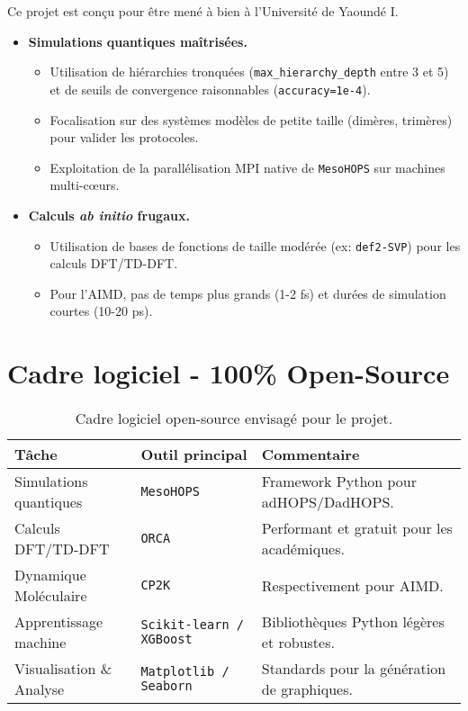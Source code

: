\documentclass[12pt, a4paper]{article}
\begin{document}
Ce projet est conçu pour être mené à bien à l'Université de Yaoundé I.
\begin{itemize}
    \item \textbf{Simulations quantiques maîtrisées.}
        \begin{itemize}
            \item Utilisation de hiérarchies tronquées (\texttt{max\_hierarchy\_depth} entre 3 et 5) et de seuils de convergence raisonnables (\texttt{accuracy=1e-4}).
            \item Focalisation sur des systèmes modèles de petite taille (dimères, trimères) pour valider les protocoles.
            \item Exploitation de la parallélisation MPI native de \texttt{MesoHOPS} sur machines multi-cœurs.
        \end{itemize}

    \item \textbf{Calculs \textit{ab initio} frugaux.}
        \begin{itemize}
            \item Utilisation de bases de fonctions de taille modérée (ex: \texttt{def2-SVP}) pour les calculs DFT/TD-DFT.
            \item Pour l'AIMD, pas de temps plus grands (1-2 fs) et durées de simulation courtes (10-20 ps).
        \end{itemize}
\end{itemize}

\section{Cadre logiciel - 100\% Open-Source}
\begin{table}[htp]
    \centering
    \caption{Cadre logiciel open-source envisagé pour le projet.}
    \label{tab:software}
    \begin{tabular}{@{}lll@{}}
        \toprule
        \textbf{Tâche} & \textbf{Outil principal} & \textbf{Commentaire} \\ \midrule
        Simulations quantiques & \texttt{MesoHOPS}\footnotemark & Framework Python pour adHOPS/DadHOPS. \\
        Calculs DFT/TD-DFT & \texttt{ORCA} & Performant et gratuit pour les académiques. \\
        Dynamique Moléculaire & \texttt{CP2K} & Respectivement pour AIMD. \\
        Apprentissage machine & \texttt{Scikit-learn / XGBoost} & Bibliothèques Python légères et robustes. \\
        Visualisation \& Analyse & \texttt{Matplotlib / Seaborn} & Standards pour la génération de graphiques. \\ \bottomrule
    \end{tabular}
\end{table}
\end{document}
